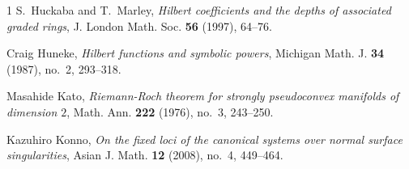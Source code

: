 \documentclass[12pt]{amsart}
\theoremstyle{definition}
\theoremstyle{remark}
\numberwithin{equation}{section}
\renewcommand{\:}{\colon}
\begin{document}
\begin{thebibliography}{1}
S.~Huckaba and T.~Marley, \emph{Hilbert coefficients and the depths 
of associated graded rings}, 
J. London Math. Soc. \textbf{56} (1997), 64--76. 


Craig Huneke, \emph{Hilbert functions and symbolic powers}, 
Michigan Math. J.
 \textbf{34} (1987), no.~2, 293--318.






Masahide Kato, \emph{Riemann-{R}och theorem for strongly pseudoconvex manifolds
  of dimension {$2$}}, Math. Ann. \textbf{222} (1976), no.~3, 243--250.

Kazuhiro Konno,   \emph{On the fixed loci of the canonical systems over normal surface
  singularities}, Asian J. Math. \textbf{12} (2008), no.~4, 449--464.








\end{thebibliography}
\end{document}
